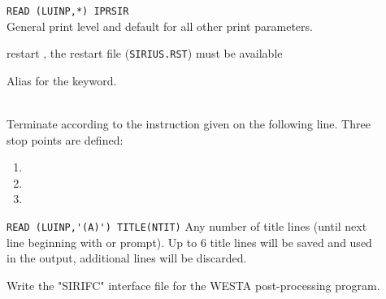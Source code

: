 \begin{description}
\item[]
  \verb"READ (LUINP,*) IPRSIR" \\
  General {\sir} print level and default for all other print parameters.

\item[]
  restart {\sir},
  the {\sir} restart file (\verb|SIRIUS.RST|) must be available

\item[]
    Alias for the  keyword.

\item[]
   \\
  Terminate {\sir} according to the instruction given on the following line.
  Three stop points are defined:
\begin{enumerate}

\item \hspace{2em} 

\item \hspace{2em} 

\item \hspace{2em} 
\end{enumerate}

\item[] 
  \verb"READ (LUINP,'(A)') TITLE(NTIT)" 
  Any number of title lines (until next line beginning with
   or \quotekw{*} prompt).
  Up to 6 title lines will be saved and used in the output, additional
  lines will be discarded.

\item[]
  Write the "SIRIFC" interface file for the WESTA post-processing program.

\end{description}



